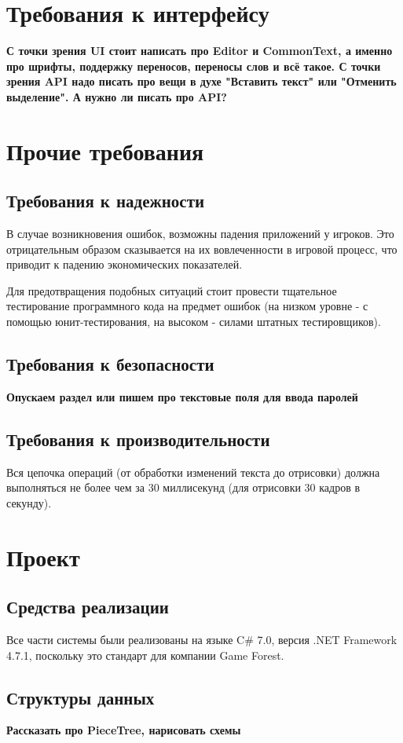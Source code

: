 \documentclass{fefu}
\begin{document}
	\section{Требования к интерфейсу}
		\textbf{С точки зрения UI стоит написать про Editor и CommonText, а именно про 
		шрифты, поддержку переносов, переносы слов и всё такое. С точки зрения API надо писать
		про вещи в духе "Вставить текст" или "Отменить выделение". А нужно ли писать про API?}
	\section{Прочие требования}
		\subsection{Требования к надежности}
			\par В случае возникновения ошибок, возможны падения приложений у игроков. Это 
			отрицательным образом сказывается на их вовлеченности в игровой процесс, что
			приводит к падению экономических показателей.
			\par Для предотвращения подобных ситуаций стоит провести тщательное тестирование
			программного кода на предмет ошибок (на низком уровне - с помощью 
			юнит-тестирования, на высоком - силами штатных тестировщиков).
		\subsection{Требования к безопасности}
			\textbf{Опускаем раздел или пишем про текстовые поля для ввода паролей}
		\subsection{Требования к производительности}
			Вся цепочка операций (от обработки изменений текста до 
			отрисовки) должна выполняться не более чем за 30 миллисекунд (для отрисовки 30 
			кадров в секунду).
	\section{Проект}
		\subsection{Средства реализации}
			Все части системы были реализованы на языке C\# 7.0, 
			версия .NET Framework 4.7.1, поскольку это стандарт для компании Game Forest.
		\subsection{Структуры данных}
			\textbf{Рассказать про PieceTree, нарисовать схемы}
\end{document}
